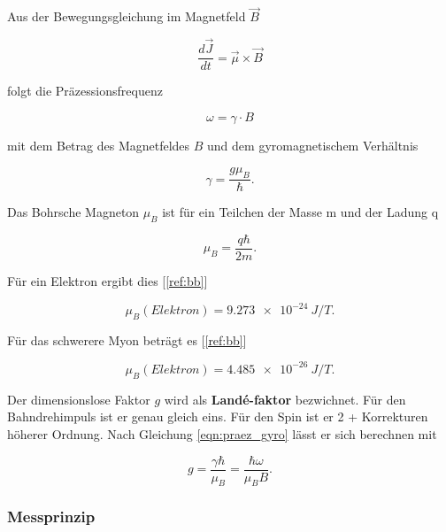 \documentclass[a4paper,ngerman]{scrartcl}
\begin{document}
Aus der Bewegungsgleichung im Magnetfeld $\vec{B}$

\begin{equation}
\frac{d\vec{J}}{dt} = \vec{\mu} \times \vec{B}
\end{equation}

folgt die Präzessionsfrequenz

\begin{equation}
\omega = \gamma \cdot B
\end{equation}

mit dem Betrag des Magnetfeldes $B$ und dem gyromagnetischem Verhältnis 

\begin{equation}
\label{eqn:praez_gyro}
\gamma = \frac{g \mu_B}{\hbar}. 
\end{equation}

Das Bohrsche Magneton $\mu_B$ ist für ein Teilchen der Masse m und der Ladung q

\begin{equation}
\mu_B = \frac{q\hbar}{2 m} .
\end{equation}


Für ein Elektron ergibt dies [\ref{ref:bb}]

\begin{equation}
\mu_B (Elektron) = \SI{9.273e-24}{ J/T } .
\end{equation}

Für das schwerere Myon beträgt es [\ref{ref:bb}]

\begin{equation}
\mu_B (Elektron) = \SI{4.485e-26}{ J/T } .
\end{equation} 


Der dimensionslose Faktor $g$ wird als \textbf{Landé-faktor} bezwichnet. Für den Bahndrehimpuls ist er genau gleich eins. Für den Spin ist er 2 + Korrekturen höherer Ordnung. Nach Gleichung \ref{eqn:praez_gyro} lässt er sich berechnen mit

\begin{equation}
g = \frac{\gamma \hbar}{\mu_B} = \frac{\hbar \omega}{\mu_B B} .
\end{equation}


\subsubsection{Messprinzip}
\label{sec:messprinzip}
\end{document}
